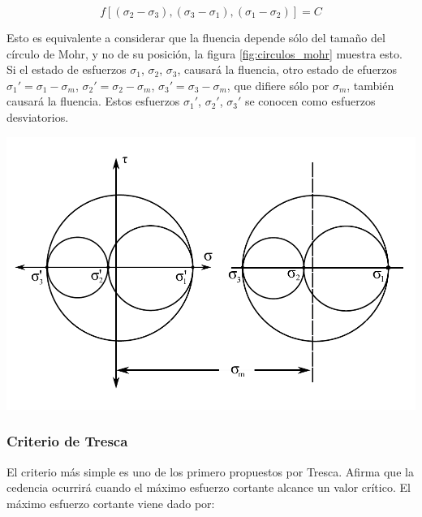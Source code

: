 \begin{equation}
f[(\sigma_2-\sigma_3 ),(\sigma_3-\sigma_1 ),(\sigma_1-\sigma_2 )] = C
\end{equation}

Esto es equivalente a considerar que la fluencia depende sólo del tamaño del círculo de Mohr, 
y no de su posición, la figura \ref{fig:circulos_mohr} muestra esto. Si el estado de esfuerzos 
$\sigma_1$, $\sigma_2$, $\sigma_3$, causará la fluencia, otro estado de efuerzos 
$\sigma_1' = \sigma_1 - \sigma_m $, $\sigma_2' = \sigma_2 - \sigma_m $, $\sigma_3' = \sigma_3 - \sigma_m $, 
que difiere sólo por $\sigma_m$, también causará la fluencia. Estos esfuerzos $\sigma_1'$, $\sigma_2'$, 
$\sigma_3'$ se conocen como esfuerzos desviatorios. ~\cite{hosford2007}

\begin{center}
\includegraphics[scale=0.75]{src/ch2/circulos_mohr_svg}
\label{fig:circulos_mohr}
\end{center}


\subsubsection{Criterio de Tresca}

El criterio más simple es uno de los primero propuestos por Tresca. Afirma que la cedencia 
ocurrirá cuando el máximo esfuerzo cortante alcance un valor crítico. El máximo esfuerzo 
cortante viene dado por:

